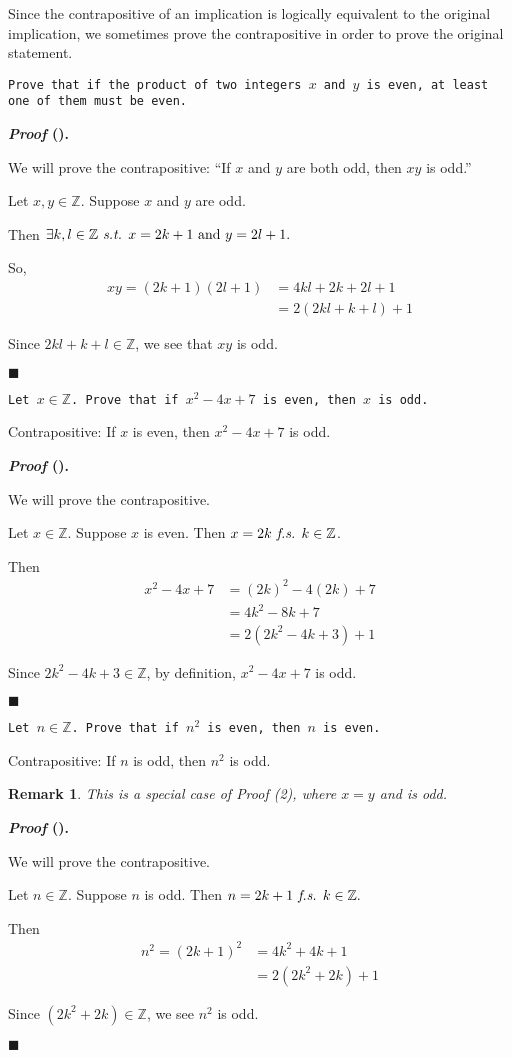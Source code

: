 \documentclass[12pt,a4paper]{article}
\newcounter{nprf}[subsection]
\newtheorem*{rmk}{\indent Remark}
\newenvironment*{prf}{\par\indent\textbf{\textit{Proof} (\stepcounter{nprf}\thenprf). }\par }{\par\hfill $\blacksquare$\par}
\def\Z{{\mathbb{Z}}}
\def\st{\emph{ s.t. }}
\def\fs{\emph{ f.s. }}
\begin{document}
Since the contrapositive of an implication is logically equivalent to the original implication, we sometimes prove the contrapositive in order to prove the original statement. 
\begin{framed}
\noindent\texttt{Prove that if the product of two integers $x$ and $y$ is even, at least one of them must be even.}
\begin{prf}
	We will prove the contrapositive: ``If $x$ and $y$ are both odd, then $xy$ is odd.''\par Let $x,y\in\Z$. Suppose $x$ and $y$ are odd.\par Then $\exists k,l\in\Z\st x=2k+1\text{ and }y=2l+1.$\par So, \[\begin{aligned}
		xy=(2k+1)(2l+1)&=4kl+2k+2l+1\\&=2(2kl+k+l)+1
	\end{aligned}\]\par Since $2kl+k+l\in\Z$, we see that $xy$ is odd.
\end{prf}	
\end{framed}
\begin{framed}
\noindent\texttt{Let $x\in\Z$. Prove that if $x^2-4x+7$ is even, then $x$ is odd. }\par
Contrapositive: If $x$ is even, then $x^2-4x+7$ is odd.
\begin{prf}
	We will prove the contrapositive.\par Let $x\in\Z$. Suppose $x$ is even. Then $x=2k\fs k\in\Z$.\par Then \[\begin{aligned}
		x^2-4x+7&=(2k)^2-4(2k)+7\\&=4k^2-8k+7\\&=2(2k^2-4k+3)+1
	\end{aligned}\]\par Since $2k^2-4k+3\in\Z$, by definition, $x^2-4x+7$ is odd. 
\end{prf}
\end{framed}
\begin{framed}
\noindent\texttt{Let $n\in\Z$. Prove that if $n^2$ is even, then $n$ is even.}\par 
Contrapositive: If $n$ is odd, then $n^2$ is odd. 
\begin{rmk}	This is a special case of Proof (2), where $x=y$ and is odd.\end{rmk}
\begin{prf}
	We will prove the contrapositive.\par Let $n\in\Z$. Suppose $n$ is odd. Then $n=2k+1\fs k\in\Z.$\par Then \[\begin{aligned}
		n^2=(2k+1)^2&=4k^2+4k+1\\&=2(2k^2+2k)+1
	\end{aligned}\]\par Since $(2k^2+2k)\in\Z$, we see $n^2$ is odd. 
\end{prf}
\end{framed}
\end{document}
